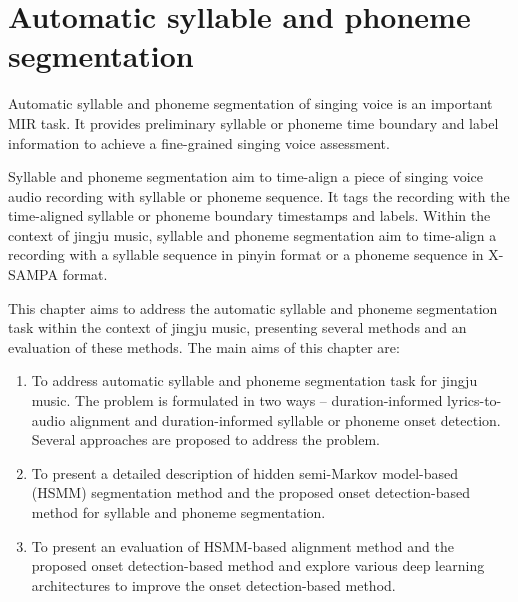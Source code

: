 \makeatletter
\def\BState{\State\hskip-\ALG@thistlm}
\makeatother

\chapter{Automatic syllable and phoneme segmentation}\label{chap:segmentation}

Automatic syllable and phoneme segmentation of singing voice is an important \gls{MIR} task. It provides preliminary syllable or phoneme time boundary and label information to achieve a fine-grained singing voice assessment.

Syllable and phoneme segmentation aim to time-align a piece of singing voice audio recording with syllable or phoneme sequence. It tags the recording with the time-aligned syllable or phoneme boundary timestamps and labels. Within the context of jingju music, syllable and phoneme segmentation aim to time-align a recording with a syllable sequence in pinyin format or a phoneme sequence in \gls{X-SAMPA} format.

This chapter aims to address the automatic syllable and phoneme segmentation task within the context of jingju music, presenting several methods and an evaluation of these methods. The main aims of this chapter are:

\begin{enumerate}[leftmargin=*]

\item To address automatic syllable and phoneme segmentation task for jingju music. The problem is formulated in two ways -- duration-informed lyrics-to-audio alignment and duration-informed syllable or phoneme onset detection. Several approaches are proposed to address the problem.
\item To present a detailed description of hidden semi-Markov model-based (\gls{HSMM}) segmentation method and the proposed onset detection-based method for syllable and phoneme segmentation.
\item To present an evaluation of \gls{HSMM}-based alignment method and the proposed onset detection-based method and explore various deep learning architectures to improve the onset detection-based method.
\end{enumerate}

